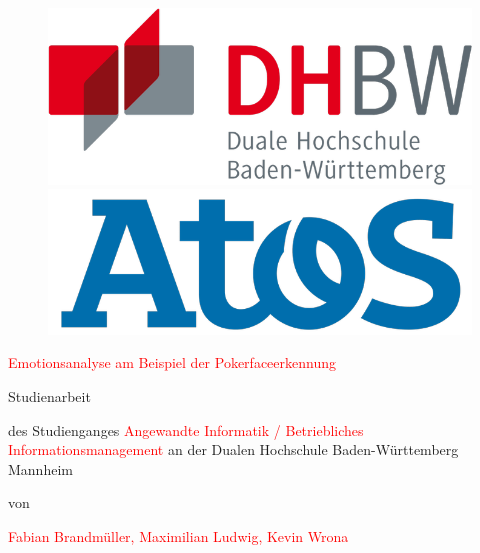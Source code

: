 %
\begin{titlepage}
	\begin{flushleft}
	\begin{figure}
		\hspace*{-0,5cm}
		\includegraphics[scale=0.25]{Bilder/DHBW_logo.jpg} \hspace*{5cm}
		\includegraphics[scale=0.25]{Bilder/Atos_logo.png}
	\end{figure}
	\end{flushleft}
	\vspace*{-0.6cm}
	\begin{center}
	\textcolor{red}{Emotionsanalyse am Beispiel der Pokerfaceerkennung} \par \vspace*{0,5cm}
	Studienarbeit \par \vspace*{2cm}
	des Studienganges \textcolor{red}{Angewandte Informatik / Betriebliches Informationsmanagement}
	an der Dualen Hochschule Baden-Württemberg Mannheim \par \vspace*{1cm}
	von \par \vspace*{0,5cm}
	\textcolor{red}{Fabian Brandmüller, Maximilian Ludwig, Kevin Wrona} \par \vspace*{1cm}

\end{center}
\end{titlepage}
